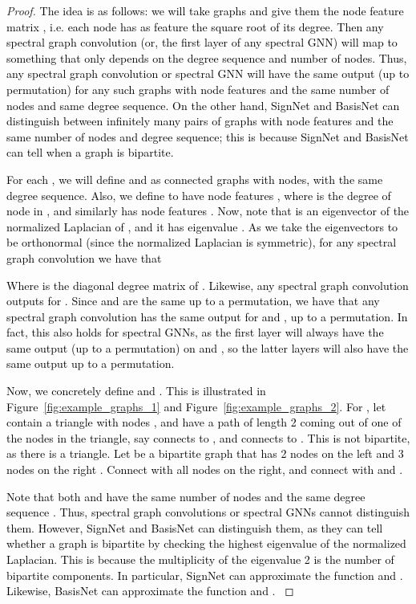 \documentclass{article} \usepackage{iclr2023_conference,times}
\newcommand{\rebut}[1]{\textcolor{black}{#1}}
\begin{document}
\begin{proof}
    \rebut{
    The idea is as follows: we will take graphs  and give them the node feature matrix , i.e. each node has as feature the square root of its degree. Then any spectral graph convolution (or, the first layer of any spectral GNN) will map  to something that only depends on the degree sequence and number of nodes. Thus, any spectral graph convolution or spectral GNN will have the same output (up to permutation) for any such graphs  with node features  and the same number of nodes and same degree sequence. On the other hand, SignNet and BasisNet can distinguish between infinitely many pairs of graphs  with node features  and the same number of nodes and degree sequence; this is because SignNet and BasisNet can tell when a graph is bipartite.
    }
    
    \rebut{For each , we will define  and  as connected graphs with  nodes, with the same degree sequence. Also, we define  to have node features , where  is the degree of node  in , and similarly  has node features . Now, note that  is an eigenvector of the normalized Laplacian of , and it has eigenvalue . As we take the eigenvectors to be orthonormal (since the normalized Laplacian is symmetric), for any spectral graph convolution we have that}
    
    \rebut{Where  is the diagonal degree matrix of . Likewise, any spectral graph convolution outputs  for . Since  and  are the same up to a permutation, we have that any spectral graph convolution has the same output for  and , up to a permutation. In fact, this also holds for spectral GNNs, as the first layer will always have the same output (up to a permutation) on  and , so the latter layers will also have the same output up to a permutation.}

    \rebut{Now, we concretely define  and . This is illustrated in Figure~\ref{fig:example_graphs_1} and Figure~\ref{fig:example_graphs_2}. For , let  contain a triangle with nodes , and have a path of length 2 coming out of one of the nodes in the triangle, say  connects to , and  connects to . This is not bipartite, as there is a triangle. Let  be a bipartite graph that has 2 nodes on the left  and 3 nodes on the right . Connect  with all nodes on the right, and connect  with  and .}
    
    \rebut{Note that both  and  have the same number of nodes and the same degree sequence . Thus, spectral graph convolutions or spectral GNNs cannot distinguish them. However, SignNet and BasisNet can distinguish them, as they can tell whether a graph is bipartite by checking the highest eigenvalue of the normalized Laplacian. This is because the multiplicity of the eigenvalue 2 is the number of bipartite components. In particular, SignNet can approximate the function  and . Likewise, BasisNet can approximate the function  and .
    }
    

\end{proof}
\end{document}
